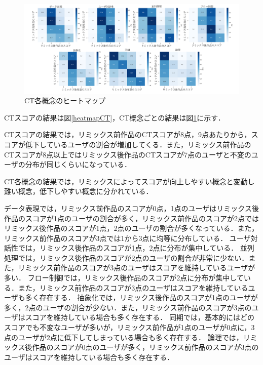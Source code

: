 \documentclass[submit,techrep,noauthor]{ipsj}
\begin{document}
\begin{figure}[t]
  \centering
  \includegraphics[width=\textwidth]{@IPSJ_SIGSE202511_Horio/fig/heatmapCTf.pdf}
  \caption{CT各概念のヒートマップ}
  \label{heatmap}
\end{figure}

CTスコアの結果は図\ref{heatmapCT}，CT概念ごとの結果は図\ref{heatmap}に示す．

CTスコアの結果では，リミックス前作品のCTスコアが8点，9点あたりから，スコアが低下しているユーザの割合が増加してくる．また，リミックス前作品のCTスコアが8点以上ではリミックス後作品のCTスコアが7点のユーザと不変のユーザの分布が同じくらいになっている．

CT各概念の結果では，リミックスによってスコアが向上しやすい概念と変動し難い概念，低下しやすい概念に分かれている．

データ表現では，リミックス前作品のスコアが0点，1点のユーザはリミックス後作品のスコアが1点のユーザの割合が多く，リミックス前作品のスコアが2点ではリミックス後作品のスコアが1点，2点のユーザの割合が多くなっている．また，リミックス前作品のスコアが3点では1から3点に均等に分布している．
ユーザ対話性では，リミックス後作品のスコアが1点，2点に分布が集中している．
並列処理では，リミックス後作品のスコアが2点のユーザの割合が非常に少ない．また，リミックス前作品のスコアが3点のユーザはスコアを維持しているユーザが多い．
フロー制御では，リミックス後作品のスコアが2点に分布が集中している．また，リミックス前作品のスコアが3点のユーザはスコアを維持しているユーザも多く存在する．
抽象化では，リミックス後作品のスコアが1点のユーザが多く，2点のユーザの割合が少ない．また，リミックス前作品のスコアが3点のユーザはスコアを維持している場合も多く存在する．
同期では，基本的にはどのスコアでも不変なユーザが多いが，リミックス前作品が1点のユーザが0点に，3点のユーザが2点に低下してしまっている場合も多く存在する．
論理では，リミックス後作品のスコアが0点のユーザが多く，リミックス前作品のスコアが3点のユーザはスコアを維持している場合も多く存在する．
\end{document}
